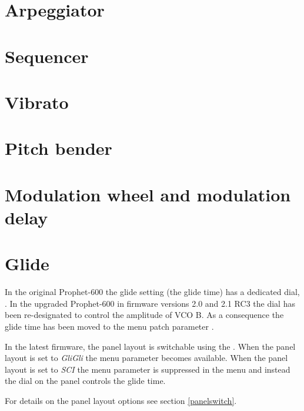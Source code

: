 \documentclass[landscape, 11pt, oneside, twoside]{report}
\newenvironment{flowtext}{\addmargin[0cm]{0cm}}{\endaddmargin} %
\begin{document}
\begin{flowtext}
\pagebreak

\section{Arpeggiator}\label{arp}



\pagebreak

\section{Sequencer}\label{seq}



\section{Vibrato}\label{vib}



\section{Pitch bender}\label{pitchbend}



\section{Modulation wheel and modulation delay}\label{modwheel}



\section{Glide}\label{glide}

In the original Prophet-600 the glide setting (the glide time) has a dedicated dial, \glidepot. In the upgraded Prophet-600 in firmware versions 2.0 and 2.1 RC3 the dial has been re-designated to control the amplitude of VCO B. As a consequence the glide time has been moved to the menu patch parameter \glide. 

In the latest firmware, the panel layout is switchable using the \miscsett \panelswitch. When the panel layout is set to \textit{GliGli} the menu parameter \glide becomes available. When the panel layout is set to \textit{SCI} the menu parameter \glide is suppressed in the menu and instead the \glidepot dial on the panel controls the glide time. 

For details on the panel layout options see section \ref{panelswitch}.


\end{flowtext}
\end{document}
